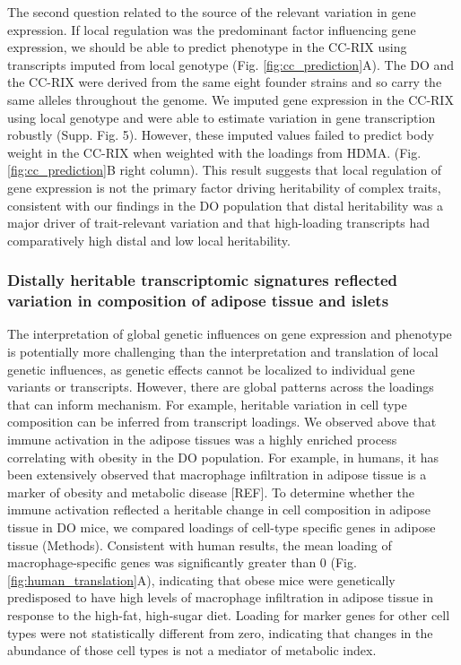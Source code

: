 \documentclass[
]{article}
\begin{document}
The second question related to the source of the relevant variation in
gene expression. If local regulation was the predominant factor
influencing gene expression, we should be able to predict phenotype in
the CC-RIX using transcripts imputed from local genotype (Fig.
\ref{fig:cc_prediction}A). The DO and the CC-RIX were derived from the
same eight founder strains and so carry the same alleles throughout the
genome. We imputed gene expression in the CC-RIX using local genotype
and were able to estimate variation in gene transcription robustly
(Supp. Fig. 5). However, these imputed values failed to predict body
weight in the CC-RIX when weighted with the loadings from HDMA. (Fig.
\ref{fig:cc_prediction}B right column). This result suggests that local
regulation of gene expression is not the primary factor driving
heritability of complex traits, consistent with our findings in the DO
population that distal heritability was a major driver of trait-relevant
variation and that high-loading transcripts had comparatively high
distal and low local heritability.

\subsubsection{Distally heritable transcriptomic signatures reflected
variation in composition of adipose tissue and
islets}\label{distally-heritable-transcriptomic-signatures-reflected-variation-in-composition-of-adipose-tissue-and-islets}

The interpretation of global genetic influences on gene expression and
phenotype is potentially more challenging than the interpretation and
translation of local genetic influences, as genetic effects cannot be
localized to individual gene variants or transcripts. However, there are
global patterns across the loadings that can inform mechanism. For
example, heritable variation in cell type composition can be inferred
from transcript loadings. We observed above that immune activation in
the adipose tissues was a highly enriched process correlating with
obesity in the DO population. For example, in humans, it has been
extensively observed that macrophage infiltration in adipose tissue is a
marker of obesity and metabolic disease {[}REF{]}. To determine whether
the immune activation reflected a heritable change in cell composition
in adipose tissue in DO mice, we compared loadings of cell-type specific
genes in adipose tissue (Methods). Consistent with human results, the
mean loading of macrophage-specific genes was significantly greater than
0 (Fig. \ref{fig:human_translation}A), indicating that obese mice were
genetically predisposed to have high levels of macrophage infiltration
in adipose tissue in response to the high-fat, high-sugar diet. Loading
for marker genes for other cell types were not statistically different
from zero, indicating that changes in the abundance of those cell types
is not a mediator of metabolic index.
\end{document}
